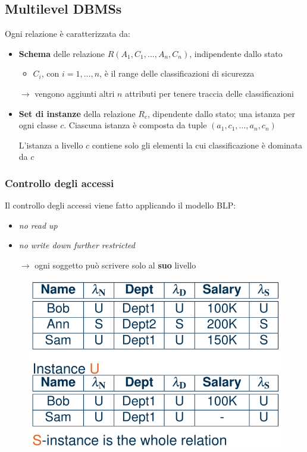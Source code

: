 \documentclass{report}
\begin{document}
\subsection{Multilevel DBMSs}
Ogni relazione è caratterizzata da:
\begin{itemize}
    \item \textbf{Schema} delle relazione $R(A_1,C_1,\dots,A_n,C_n)$, indipendente
    dallo stato 
    \begin{itemize}
        \item $C_i$, con $i = 1, \dots, n$, è il range delle classificazioni di sicurezza
    \end{itemize}

    $\rightarrow$ vengono aggiunti altri $n$ attributi per tenere traccia delle classificazioni
    \item \textbf{Set di instanze} della relazione $R_c$, dipendente dallo stato; una istanza 
    per ogni classe $c$. Ciascuna istanza è composta da tuple $(a_1,c_1,\dots,a_n,c_n)$

    \noindent L'istanza a livello $c$ contiene solo gli elementi la cui classificazione è 
    dominata da $c$
\end{itemize}

\subsubsection{Controllo degli accessi}
Il controllo degli accessi viene fatto applicando il modello BLP:
\begin{itemize}
    \item \textit{no read up}
    \item \textit{no write down further restricted} 
    
    $\rightarrow$ ogni soggetto può scrivere solo al \textbf{suo} livello
\end{itemize}

\begin{figure}[H]
    \centering
    \includegraphics[width=0.7\linewidth]{images/multi-dbms.png}
\end{figure}
\end{document}
